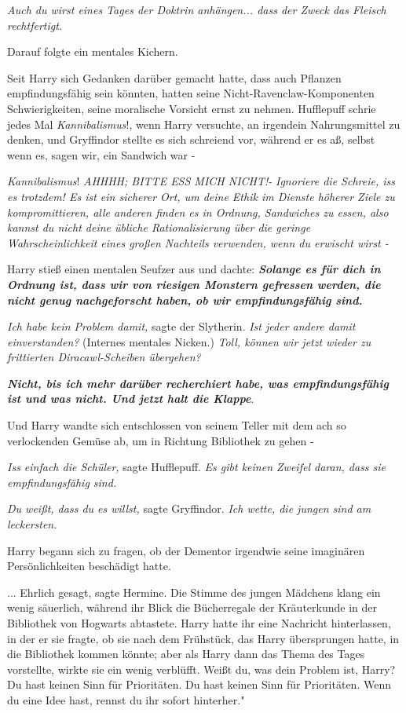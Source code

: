 \emph{Auch du wirst eines Tages der Doktrin anhängen... dass der Zweck das
Fleisch rechtfertigt.}

Darauf folgte ein mentales Kichern.

Seit Harry sich Gedanken darüber gemacht hatte, dass auch Pflanzen
empfindungsfähig sein könnten, hatten seine Nicht-Ravenclaw-Komponenten
Schwierigkeiten, seine moralische Vorsicht ernst zu nehmen. Hufflepuff schrie
jedes Mal \glqq \emph{Kannibalismus}!\grqq{}, wenn Harry versuchte, an irgendein
Nahrungsmittel zu denken, und Gryffindor stellte es sich schreiend vor, während
er es aß, selbst wenn es, sagen wir, ein Sandwich war -

\emph{Kannibalismus}!
\emph{AHHHH; BITTE ESS MICH NICHT!-}
\emph{Ignoriere die Schreie, iss es trotzdem! Es ist ein sicherer Ort, um deine
Ethik im Dienste höherer Ziele zu kompromittieren, alle anderen finden es in
Ordnung, Sandwiches zu essen, also kannst du nicht deine übliche
Rationalisierung über die geringe Wahrscheinlichkeit eines großen Nachteils
verwenden, wenn du erwischt wirst -}

Harry stieß einen mentalen Seufzer aus und dachte: \textbf{\emph{Solange es für
dich in Ordnung ist, dass wir von riesigen Monstern gefressen werden, die nicht
genug nachgeforscht haben, ob wir empfindungsfähig sind. }}

\emph{Ich habe kein Problem damit,} sagte der Slytherin. \emph{Ist jeder andere
damit einverstanden?} (Internes mentales Nicken.) \emph{Toll, können wir jetzt
wieder zu frittierten Diracawl-Scheiben übergehen?}

\textbf{\emph{Nicht, bis ich mehr darüber recherchiert habe, was
empfindungsfähig ist und was nicht. Und jetzt halt die Klappe}}.

Und Harry wandte sich entschlossen von seinem Teller mit dem ach so verlockenden
Gemüse ab, um in Richtung Bibliothek zu gehen -

\emph{Iss einfach die Schüler,} sagte Hufflepuff.
\emph{Es gibt keinen Zweifel daran, dass sie empfindungsfähig sind.}

\emph{Du weißt, dass du es willst, }sagte Gryffindor.
\emph{Ich wette, die jungen sind am leckersten.}

Harry begann sich zu fragen, ob der Dementor irgendwie seine imaginären
Persönlichkeiten beschädigt hatte.

... \glqq Ehrlich gesagt\grqq{}, sagte Hermine. Die Stimme des jungen Mädchens
klang ein wenig säuerlich, während ihr Blick die Bücherregale der Kräuterkunde
in der Bibliothek von Hogwarts abtastete. Harry hatte ihr eine Nachricht
hinterlassen, in der er sie fragte, ob sie nach dem Frühstück, das Harry
übersprungen hatte, in die Bibliothek kommen könnte; aber als Harry dann das
Thema des Tages vorstellte, wirkte sie ein wenig verblüfft. \glqq Weißt du, was
dein Problem ist, Harry? Du hast keinen Sinn für Prioritäten. Du hast keinen
Sinn für Prioritäten. Wenn du eine Idee hast, rennst du ihr sofort hinterher."

